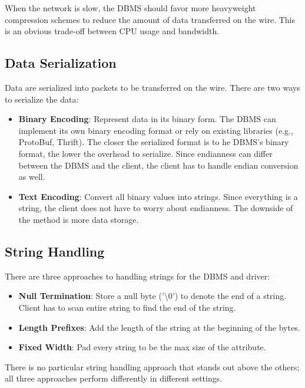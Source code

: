 \documentclass[11pt]{article}
\begin{document}
When the network is slow, the DBMS should favor more heavyweight compression schemes to reduce the amount of data transferred on the wire. This is an obvious trade-off between CPU usage and bandwidth.

\subsection*{Data Serialization}
Data are serialized into packets to be transferred on the wire. There are two ways to serialize the data:
\begin{itemize}
    \item \textbf{Binary Encoding}: Represent data in its binary form. The DBMS can implement its own binary encoding format or rely on existing libraries (e.g., ProtoBuf, Thrift). The closer the serialized format is to he DBMS's binary format, the lower the overhead to serialize. Since endianness can differ between the DBMS and the client, the client has to handle endian conversion as well. 
    \item \textbf{Text Encoding}: Convert all binary values into strings. Since everything is a string, the client does not have to worry about endianness. The downside of the method is more data storage.
\end{itemize}

\subsection*{String Handling}
There are three approaches to handling strings for the DBMS and driver:
\begin{itemize}
    \item \textbf{Null Termination}: Store a null byte ('\textbackslash 0') to denote the end of a string. Client has to scan entire string to find the end of the string.
    \item \textbf{Length Prefixes}: Add the length of the string at the beginning of the bytes.
    \item \textbf{Fixed Width}: Pad every string to be the max size of the attribute.
\end{itemize}
There is no particular string handling approach that stands out above the others; all three approaches perform differently in different settings.
\end{document}
